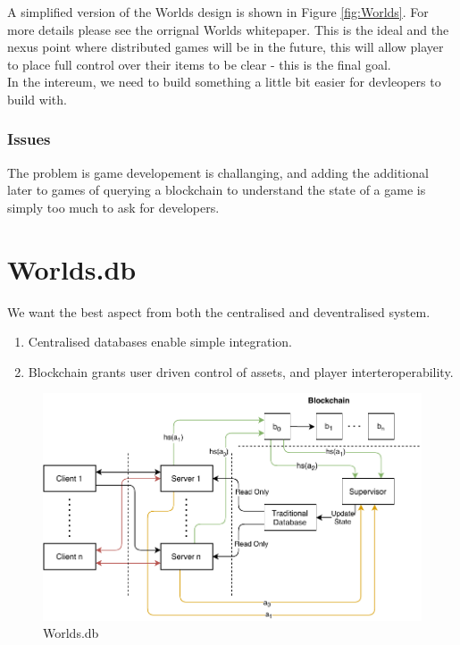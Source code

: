 \documentclass[runningheads,a4paper]{llncs}
\begin{document}
A simplified version of the Worlds design is shown in Figure \ref{fig:Worlds}.
For more details please see the orrignal Worlds whitepaper. This is the ideal
and the nexus point where distributed games will be in the future, this will
allow player to place full control over their items to be clear - this is the
final goal.
\\

In the intereum, we need to build something a little bit easier for devleopers
to build with.

\subsubsection{Issues}

The problem is game developement is challanging, and adding the additional later to games
of querying a blockchain to understand the state of a game is simply too much to
ask for developers.

\section{Worlds.db}
We want the best aspect from both the
centralised and deventralised system.

\begin{enumerate}
\item Centralised databases enable simple integration.
\item Blockchain grants user driven control of assets, and player interteroperability.
\end{enumerate}


\begin{figure}[H]
\includegraphics[]{img/worldsdb.pdf}
\caption{Worlds.db}
\label{fig:worldsdb}
\end{figure}
\end{document}
